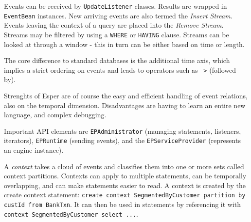 \documentclass[a4paper,10pt]{article}
\begin{document}
\vspace{3mm}

Events can be received by \lstinline|UpdateListener| classes. Results are
wrapped in \lstinline|EventBean| instances. New arriving events are also termed
the \emph{Insert Stream}.  Events leaving the context of a query are placed
into the \emph{Remove Stream}. Streams may be filtered by using a
\lstinline|WHERE| or \lstinline|HAVING| clause. Streams can be looked at
through a window - this in turn can be either based on time or length.

The core difference to standard databases is the additional time axis, which
implies a strict ordering on events and leads to operators such as
\lstinline|->| (followed by).

Strenghts of Esper are of course the easy and efficient handling of event
relations, also on the temporal dimension. Disadvantages are having to learn an
entire new language, and complex debugging.

Important API elements are \lstinline|EPAdministrator| (managing statements, listeners,
iterators), \lstinline|EPRuntime| (sending events), and the \lstinline|EPServiceProvider|
(represents an engine instance).

A \emph{context} takes a cloud of events and classifies them into one or more
sets called context partitions. Contexts can apply to multiple statements, can
be temporally overlapping, and can make statements easier to read. A context is
created by the create context statement:
\lstinline|create context SegmentedByCustomer partition by custId from BankTxn|.
It can then be used in
statements by referencing it with \lstinline|context SegmentedByCustomer select ...|. 
\end{document}
